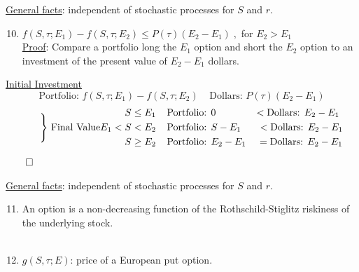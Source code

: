 \documentclass[
14pt,notheorems,hyperref={pdfauthor=whatever}
]{beamer}
\begin{document}
\begin{frame}
\underline{General facts}: independent of stochastic processes for $S$ and $r$.\\
\hfill
\begin{enumerate}
    \setcounter{enumi}{9}
    \item $f(S,\tau;E_1)-f(S,\tau;E_2) \leq P(\tau)(E_2-E_1)\;,$ for $E_2>E_1$\\
    \hfill\break
    \underline{Proof}: Compare a portfolio long the $E_1$ option and short the $E_2$ option to an investment of the present value of $E_2-E_1$ dollars.\\
    \hfill
\end{enumerate}
\underline{Initial Investment}
\[\text{Portfolio: } f(S,\tau;E_1)-f(S,\tau;E_2) \;\;\;\; \text{Dollars: } P(\tau)(E_2-E_1)\]
\begin{align*} \tag*{\Bigg\} Final Value}
\begin{split}
    S &\leq E_1 \;\;\;\; \text{Portfolio: } 0 \;\;\;\;\;\;\;\;\;\;\;\;\;\;< \text{Dollars: } E_2-E_1
    \\
    E_1 < S &< E_2 \;\;\;\; \text{Portfolio: } S-E_1 \;\;\;\;\;\;< \text{Dollars: } E_2-E_1
    \\
    S &\geq E_2 \;\;\;\; \text{Portfolio: } E_2-E_1 \;\;\;\;= \text{Dollars: } E_2-E_1
    \\
\end{split}
\end{align*}
\hfill$\qed$
\end{frame}

\begin{frame}
\underline{General facts}: independent of stochastic processes for $S$ and $r$.\\
\hfill
\begin{enumerate}
    \setcounter{enumi}{10}
    \item An option is a non-decreasing function of the Rothschild-Stiglitz riskiness of the underlying stock.\\
    \hfill{}\\
    \hfill\break
    \item $g(S,\tau;E)$: price of a European put option.\\
    \hfill\break
\end{enumerate}
\end{frame}
\end{document}
